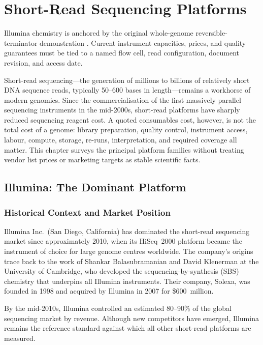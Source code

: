 \chapter{Short-Read Sequencing Platforms}
\label{ch:shortread}

\begin{sourcebox}
Illumina chemistry is anchored by the original whole-genome reversible-terminator demonstration \cite{bentley2008}. Current instrument capacities, prices, and quality guarantees must be tied to a named flow cell, read configuration, document revision, and access date.
\end{sourcebox}

Short-read sequencing---the generation of millions to billions of relatively short DNA sequence reads, typically 50--600 bases in length---remains a workhorse of modern genomics. Since the commercialisation of the first massively parallel sequencing instruments in the mid-2000s, short-read platforms have sharply reduced sequencing reagent cost. A quoted consumables cost, however, is not the total cost of a genome: library preparation, quality control, instrument access, labour, compute, storage, re-runs, interpretation, and required coverage all matter. This chapter surveys the principal platform families without treating vendor list prices or marketing targets as stable scientific facts.

\section{Illumina: The Dominant Platform}
\label{sec:illumina}

\subsection{Historical Context and Market Position}

Illumina Inc.\ (San Diego, California) has dominated the short-read sequencing market since approximately 2010, when its HiSeq~2000 platform became the instrument of choice for large genome centres worldwide. The company's origins trace back to the work of Shankar Balasubramanian and David Klenerman at the University of Cambridge, who developed the sequencing-by-synthesis (SBS) chemistry that underpins all Illumina instruments. Their company, Solexa, was founded in 1998 and acquired by Illumina in 2007 for \$600~million.

By the mid-2010s, Illumina controlled an estimated 80--90\% of the global sequencing market by revenue. Although new competitors have emerged, Illumina remains the reference standard against which all other short-read platforms are measured.

